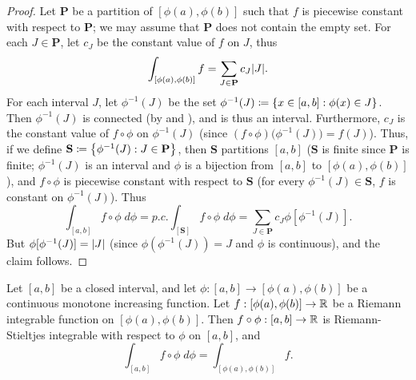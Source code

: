 \begin{proof}
  Let \(\mathbf{P}\) be a partition of \([\phi(a), \phi(b)]\) such that \(f\) is piecewise constant with respect to \(\mathbf{P}\);
  we may assume that \(\mathbf{P}\) does not contain the empty set.
  For each \(J \in \mathbf{P}\), let \(c_J\) be the constant value of \(f\) on \(J\), thus
  \[
    \int_{[\phi(a), \phi(b)]} f = \sum_{J \in \mathbf{P}} c_J \abs{J}.
  \]
  For each interval \(J\), let \(\phi^{-1}(J)\) be the set \(\phi^{-1}(J) \coloneqq \left\lbrace x \in [a, b] : \phi(x) \in J\right\rbrace\).
  Then \(\phi^{-1}(J)\) is connected (by  and ), and is thus an interval.
  Furthermore, \(c_J\) is the constant value of \(f \circ \phi\) on \(\phi^{-1}(J)\) (since \((f \circ \phi)\big(\phi^{-1}(J)\big) = f(J)\)).
  Thus, if we define \(\mathbf{S} \coloneqq \left\lbrace\phi^{-1} (J) : J \in \mathbf{P}\right\rbrace\), then \(\mathbf{S}\) partitions \([a, b]\)
  (\(\mathbf{S}\) is finite since \(\mathbf{P}\) is finite;
  \(\phi^{-1}(J)\) is an interval and \(\phi\) is a bijection from \([a, b]\) to \([\phi(a), \phi(b)]\)),
  and \(f \circ \phi\) is piecewise constant with respect to \(\mathbf{S}\) (for every \(\phi^{-1}(J) \in \mathbf{S}\), \(f\) is constant on \(\phi^{-1}(J)\)).
  Thus
  \[
    \int_{[a, b]} f \circ \phi \; d \phi = p.c. \int_{[\mathbf{S}]} f \circ \phi \; d \phi = \sum_{J \in \mathbf{P}} c_J \phi[\phi^{-1}(J)].
  \]
  But \(\phi[\phi^{-1}(J)] = \left\lvert J\right\rvert\) (since \(\phi(\phi^{-1}(J)) = J\) and \(\phi\) is continuous), and the claim follows.
\end{proof}

\begin{prop}\label{i:11.10.6}
  Let \([a, b]\) be a closed interval, and let \(\phi : [a, b] \to [\phi(a), \phi(b)]\) be a continuous monotone increasing function.
  Let \(f : [\phi(a), \phi(b)] \to \mathbb{R}\) be a Riemann integrable function on \([\phi(a), \phi(b)]\).
  Then \(f \circ \phi : [a, b] \to \mathbb{R}\) is Riemann-Stieltjes integrable with respect to \(\phi\) on \([a, b]\), and
  \[
    \int_{[a, b]} f \circ \phi \; d \phi = \int_{[\phi(a), \phi(b)]} f.
  \]
\end{prop}

